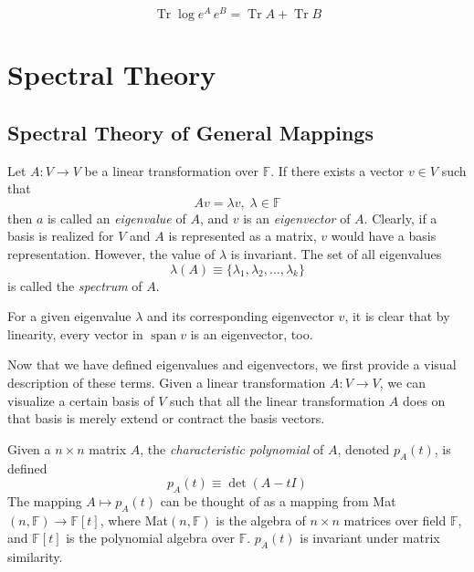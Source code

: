 \documentclass{article}
\DeclareMathOperator{\Tr}{Tr}
\DeclareMathOperator{\Span}{span}
\begin{document}
    \begin{corollary}
    \[\Tr{\log{e^A \, e^B}} = \Tr{A} + \Tr{B}\]
    \end{corollary}

\section{Spectral Theory} 

  \subsection{Spectral Theory of General Mappings}

    \begin{definition}
    Let $A: V \longrightarrow V$ be a linear transformation over $\mathbb{F}$. If there exists a vector $v \in V$ such that
    \[ A v = \lambda v, \; \lambda \in \mathbb{F}\]
    then $a$ is called an \textit{eigenvalue} of $A$, and $v$ is an \textit{eigenvector} of $A$. Clearly, if a basis is realized for $V$ and $A$ is represented as a matrix, $v$ would have a basis representation. However, the value of $\lambda$ is invariant. The set of all eigenvalues 
    \[\lambda(A) \equiv \{ \lambda_1, \lambda_2, ..., \lambda_k\}\]
    is called the \textit{spectrum} of $A$. 
    \end{definition}

    For a given eigenvalue $\lambda$ and its corresponding eigenvector $v$, it is clear that by linearity, every vector in $\Span v$ is an eigenvector, too. 

    Now that we have defined eigenvalues and eigenvectors, we first provide a visual description of these terms. Given a linear transformation $A: V \longrightarrow V$, we can visualize a certain basis of $V$ such that all the linear transformation $A$ does on that basis is merely extend or contract the basis vectors.

    \begin{definition}
    Given a $n \times n$ matrix $A$, the \textit{characteristic polynomial} of $A$, denoted $p_A (t)$, is defined
    \[ p_A (t) \equiv \det{(A - t I)}\]
    The mapping $A \mapsto p_A (t)$ can be thought of as a mapping from Mat$(n, \mathbb{F}) \longrightarrow \mathbb{F}[t]$, where Mat$(n, \mathbb{F})$ is the algebra of $n \times n$ matrices over field $\mathbb{F}$, and $\mathbb{F}[t]$ is the polynomial algebra over $\mathbb{F}$. $p_A (t)$ is invariant under matrix similarity. 
    \end{definition}
\end{document}
